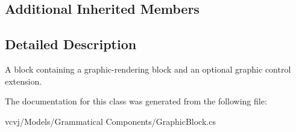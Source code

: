 \subsection*{Additional Inherited Members}


\subsection{Detailed Description}
A block containing a graphic-\/rendering block and an optional graphic control extension. 



The documentation for this class was generated from the following file\+:\begin{DoxyCompactItemize}
\item 
vcvj/\+Models/\+Grammatical Components/Graphic\+Block.\+cs\end{DoxyCompactItemize}
